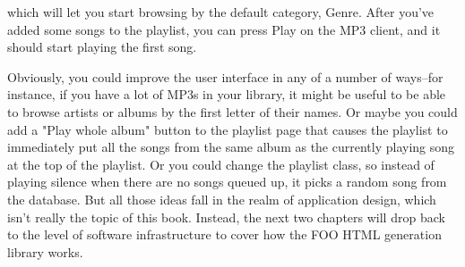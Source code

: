 which will let you start browsing by the default category, Genre. After you've added some
songs to the playlist, you can press Play on the MP3 client, and it should start playing
the first song.

Obviously, you could improve the user interface in any of a number of ways--for instance,
if you have a lot of MP3s in your library, it might be useful to be able to browse artists
or albums by the first letter of their names. Or maybe you could add a "Play whole album"
button to the playlist page that causes the playlist to immediately put all the songs from
the same album as the currently playing song at the top of the playlist. Or you could
change the playlist class, so instead of playing silence when there are no songs queued
up, it picks a random song from the database. But all those ideas fall in the realm of
application design, which isn't really the topic of this book. Instead, the next two
chapters will drop back to the level of software infrastructure to cover how the FOO HTML
generation library works.

